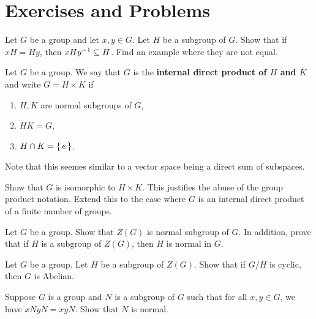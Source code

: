 \documentclass[./main.tex]{subfiles}
\begin{document}
\section{Exercises and Problems}

\begin{exercise}
    Let $G$ be a group and let $x, y \in G$. Let $H$ be a subgroup of $G$. Show
    that if $xH = Hy$, then $xHy^{-1} \subseteq H$. Find an example where they
    are not equal.
\end{exercise}

\begin{exercise}
\label{ex:internal-direct-products}
    Let $G$ be a group. We say that $G$ is the \textbf{internal direct product
    of $H$ and $K$} and write $G = H \times K$ if
    \begin{enumerate}
        \item $H, K$ are normal subgroups of $G$,
        \item $HK = G$,
        \item $H \cap K = \set{e}$.
    \end{enumerate}
    Note that this seemes similar to a vector space being a direct sum of
    subspaces. 

    Show that $G$ is isomorphic to $H \times K$. This justifies the abuse of the
    group product notation. Extend this to the case where $G$ is an internal
    direct product of a finite number of groups.
\end{exercise}

\begin{exercise}
\label{ex:center-is-always-normal}
    Let $G$ be a group. Show that $Z(G)$ is normal subgroup of $G$. In addition,
    prove that if $H$ is a subgroup of $Z(G)$, then $H$ is normal in $G$.
\end{exercise}

\begin{exercise}
    Let $G$ be a group. Let $H$ be a subgroup of $Z(G)$. Show that if $G/H$ is
    cyclic, then $G$ is Abelian. 
\end{exercise}

\begin{exercise}
\label{ex:converse-of-quotient-groups-existence}
    Suppose $G$ is a group and $N$ is a subgroup of $G$ such that for all $x, y
    \in G$, we have $xN yN = xyN$. Show that $N$ is normal.
\end{exercise}
\end{document}
